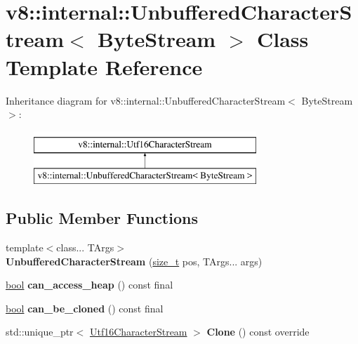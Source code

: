 \hypertarget{classv8_1_1internal_1_1UnbufferedCharacterStream}{}\section{v8\+:\+:internal\+:\+:Unbuffered\+Character\+Stream$<$ Byte\+Stream $>$ Class Template Reference}
\label{classv8_1_1internal_1_1UnbufferedCharacterStream}
Inheritance diagram for v8\+:\+:internal\+:\+:Unbuffered\+Character\+Stream$<$ Byte\+Stream $>$\+:\begin{figure}[H]
\begin{center}
\leavevmode
\includegraphics[height=2.000000cm]{classv8_1_1internal_1_1UnbufferedCharacterStream}
\end{center}
\end{figure}
\subsection*{Public Member Functions}
\begin{DoxyCompactItemize}
\item 
\mbox{\label{classv8_1_1internal_1_1UnbufferedCharacterStream_a7728efaba8d60e49f84cf4c7b5389087}} 
{\footnotesize template$<$class... T\+Args$>$ }\\{\bfseries Unbuffered\+Character\+Stream} (\mbox{\hyperlink{classsize__t}{size\+\_\+t}} pos, T\+Args... args)
\item 
\mbox{\label{classv8_1_1internal_1_1UnbufferedCharacterStream_a3f5dea519db59e4a20735b69023641f4}} 
\mbox{\hyperlink{classbool}{bool}} {\bfseries can\+\_\+access\+\_\+heap} () const final
\item 
\mbox{\label{classv8_1_1internal_1_1UnbufferedCharacterStream_a12385e2a2b0d3d58b764a25b339f01ed}} 
\mbox{\hyperlink{classbool}{bool}} {\bfseries can\+\_\+be\+\_\+cloned} () const final
\item 
\mbox{\label{classv8_1_1internal_1_1UnbufferedCharacterStream_a8c9784c51a24d05a20180e1a1308dc77}} 
std\+::unique\+\_\+ptr$<$ \mbox{\hyperlink{classv8_1_1internal_1_1Utf16CharacterStream}{Utf16\+Character\+Stream}} $>$ {\bfseries Clone} () const override
\end{DoxyCompactItemize}
